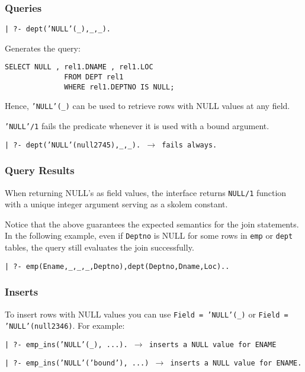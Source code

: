 \subsubsection{Queries}
%
\begin{center}

{\tt | ?- dept('NULL'(\_),\_,\_).}
\end{center}

Generates the query: 


\begin{verbatim}
SELECT NULL , rel1.DNAME , rel1.LOC
			  FROM DEPT rel1
			  WHERE rel1.DEPTNO IS NULL;
\end{verbatim}

Hence, {\tt 'NULL'(\_)} can be used to retrieve rows with NULL values 
at any field.

{\tt 'NULL'/1} fails the predicate whenever it is
used with a bound argument.
\begin{center}

{\tt | ?- dept('NULL'(null2745),\_,\_). $\rightarrow$ fails always.}
\end{center}


\subsubsection{Query Results}
When returning NULL's as field values, the interface returns {\tt NULL/1} 
function with a unique integer argument serving as a skolem constant.

Notice that the above guarantees the expected semantics for the join 
statements.  In the following example, even if {\tt Deptno} is NULL for some rows in {\tt emp} or {\tt dept} tables, the query still evaluates the join successfully.
\begin{center}

{\tt | ?- emp(Ename,\_,\_,\_,Deptno),dept(Deptno,Dname,Loc)..}
\end{center}

\subsubsection{Inserts}

To insert rows with NULL values you can use {\tt Field = 'NULL'(\_)} or
{\tt Field = 'NULL'(null2346)}.  For example:

\begin{center}

{\tt | ?- emp\_ins('NULL'(\_), ...).  $\rightarrow$ inserts a NULL value for ENAME}
\end{center}
\begin{center}

{\tt | ?- emp\_ins('NULL'('bound'), ...) $\rightarrow$ inserts a NULL value for ENAME.}

\end{center}


